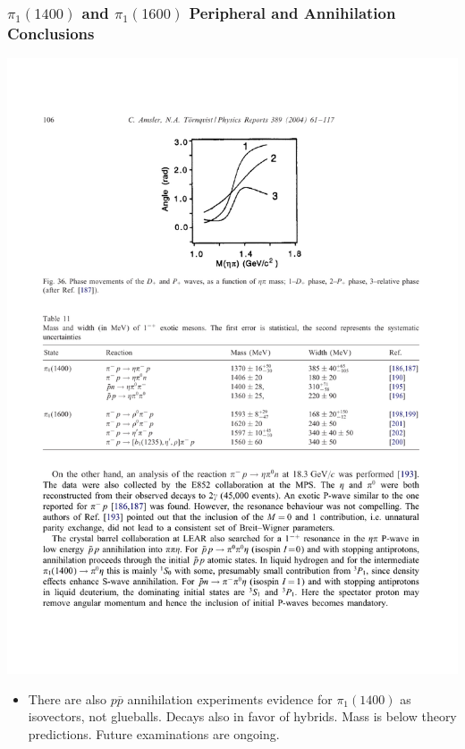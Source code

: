 \documentclass[mathserif,18pt,xcolor=table]{beamer}
\begin{document}
\begin{frame}
  \frametitle{$\pi_1(1400)$ and $\pi_1(1600)$ Peripheral and Annihilation Conclusions}
  \begin{center}
    \includegraphics[width=.9\linewidth]{../figures/pingtable.pdf}
  \end{center}
  \begin{itemize}
  \item There are also $p\overline{p}$ annihilation experiments evidence for $\pi_1(1400)$ as isovectors, not glueballs. Decays also in favor of hybrids.
    Mass is below theory predictions. Future examinations are ongoing.
  \end{itemize}
\end{frame}
\end{document}
